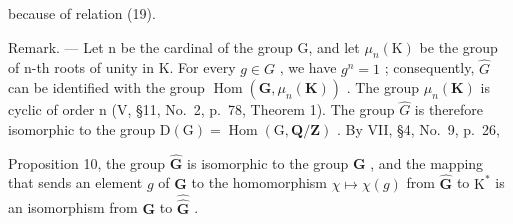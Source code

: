 because of relation (19).

Remark. --- Let n be the cardinal of the group G, and let \(\mu_{n}(\mathrm{K})\) be the group of n-th roots of unity in K. For every \(g \in G\) , we have \(g^{n} = 1\) ; consequently, \(\widehat{G}\) can be identified with the group \(\operatorname{Hom}(\mathbf{G}, \mu_{n}(\mathbf{K}))\) . The group \(\mu_{n}(\mathbf{K})\) is cyclic of order n (V, §11, No.~2, p.~78, Theorem 1). The group \(\widehat{G}\) is therefore isomorphic to the group \(\mathrm{D}(\mathrm{G}) = \operatorname{Hom}(\mathrm{G}, \mathbf{Q}/\mathbf{Z})\) . By VII, §4, No.~9, p.~26,

Proposition 10, the group \(\widehat{\mathbf{G}}\) is isomorphic to the group \(\mathbf{G}\) , and the mapping that sends an element \(g\) of \(\mathbf{G}\) to the homomorphism \(\chi \mapsto \chi(g)\) from \(\widehat{\mathbf{G}}\) to \(\mathrm{K}^*\) is an isomorphism from \(\mathbf{G}\) to \(\widehat{\widehat{\mathbf{G}}}\) .
\relax{}
